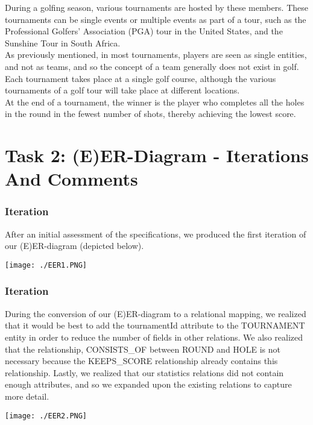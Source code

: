 \documentclass[titlepage]{article}
\begin{document}
\noindent
During a golfing season, various tournaments are hosted by these members. These tournaments can %
be single events or multiple events as part of a tour, such as the Professional Golfers’ %
Association (PGA) tour in the United States, and the Sunshine Tour in South Africa. \\

\noindent
As previously mentioned, in most tournaments, players are seen as single entities, and not as %
teams, and so the concept of a team generally does not exist in golf. Each tournament takes %
place at a single golf course, although the various tournaments of a golf tour will take place %
at different locations. \\

\noindent
At the end of a tournament, the winner is the player who completes all the holes in the round %
in the fewest number of shots, thereby achieving the lowest score.


\section{Task 2: (E)ER-Diagram - Iterations And Comments}
\vspace{2em}
\subsubsection{ Iteration}
After an initial assessment of the specifications, we produced the first iteration of our (E)ER-diagram (depicted below).
\vspace{2em}
\begin{center}
  \texttt{[image: ./EER1.PNG]}
\end{center}

\newpage
\noindent
\subsubsection{ Iteration}
During the conversion of our (E)ER-diagram to a relational mapping, we realized that it would be best to add the 
tournamentId attribute to the TOURNAMENT entity in order to reduce the number of fields in other relations. We 
also realized that the relationship, CONSISTS\_OF between ROUND and HOLE is not necessary because the
KEEPS\_SCORE relationship already contains this relationship. Lastly, we realized that our statistics 
relations did not contain enough attributes, and so we expanded upon the existing relations to capture more detail.
\vspace{2em}
\begin{center}
  \texttt{[image: ./EER2.PNG]}
\end{center}
\end{document}
